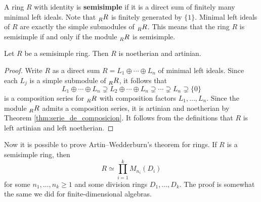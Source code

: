
A ring $R$ with identity is \textbf{semisimple} if it is a direct sum of finitely many minimal left ideals. Note
that $\prescript{}{R}{R}$ is finitely generated by $\{1\}$. Minimal left ideals of $R$ 
are exactly the simple submodules of $\prescript{}{R}{R}$. 
This means that 
the ring $R$ is semisimple if and only if the module
$\prescript{}{R}{R}$ is semisimple.  

\begin{proposition}
    Let $R$ be a semisimple ring. Then $R$ is noetherian and artinian.
\end{proposition}

\begin{proof}
    Write $R$ as a direct sum $R=L_1\oplus\cdots\oplus L_n$ of minimal left ideals. Since 
    each $L_j$ is a simple submodule of $\prescript{}{R}{R}$, it follows that 
    \[
    L_1\oplus\cdots\oplus L_n\supsetneq L_2\oplus\cdots\oplus L_n\supsetneq\cdots\supsetneq L_n\supsetneq\{0\}
    \]
    is a composition series for $\prescript{}{R}{R}$ with composition factors
    $L_1,\dots,L_n$. Since the module $\prescript{}{R}{R}$ admits a composition
    series, it is artinian and noetherian by Theorem \ref{thm:serie_de_composicion}. It follows
    from the definitions that $R$ is left artinian and left noetherian. 
\end{proof}

Now it is possible to prove Artin--Wedderburn's theorem for rings. 
If $R$ is a semisimple ring, then
\[
R\simeq \prod_{i=1}^k M_{n_i}(D_i)
\]
for some $n_1,\dots,n_k\geq1$ and some
division rings $D_1,\dots,D_k$. 
The proof is somewhat
the same we did for finite-dimensional algebras.


